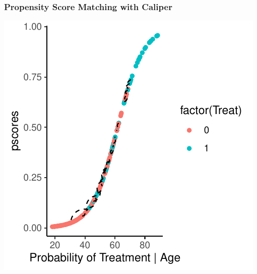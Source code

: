 \documentclass[xcolor=x11names,compress]{beamer}\usepackage[]{graphicx}\usepackage[]{color}
\makeatletter
\def\maxwidth{ %
  \ifdim\Gin@nat@width>\linewidth
    \linewidth
  \else
    \Gin@nat@width
  \fi
}
\newenvironment{knitrout}{}{} %
\renewcommand{\(}{\begin{columns}}
\renewcommand{\)}{\end{columns}}
\newcommand{\<}[1]{\begin{column}{#1}}
\renewcommand{\>}{\end{column}}
\makeatother
\begin{document}
\begin{frame}
\frametitle{Propensity Score Matching with Caliper}
\begin{center}
\begin{knitrout}
\color{fgcolor}
\includegraphics[width=\maxwidth]{figure/pscore_matching_caliper_1-1} 

\end{knitrout}
\end{center}
\end{frame}
\end{document}
